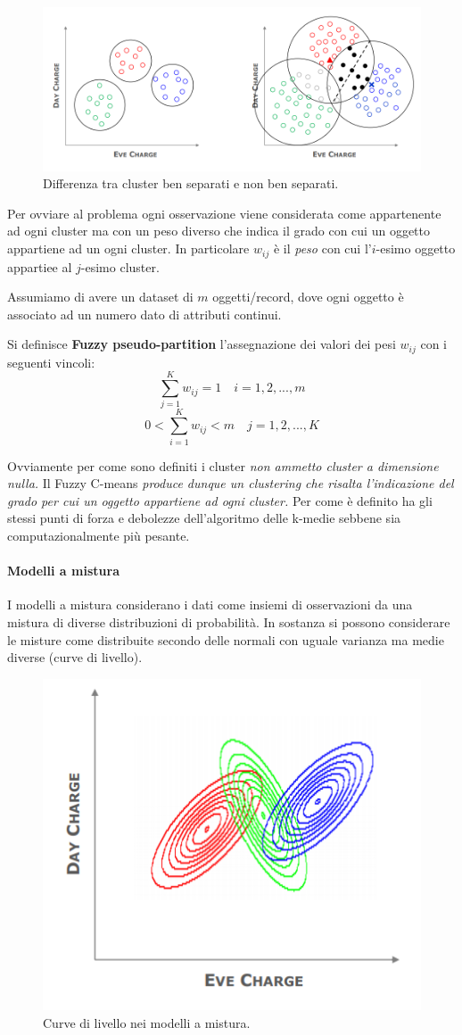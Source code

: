 \begin{figure}[H]
	\centering
	\includegraphics[height=0.4 \linewidth]{clustering/pict/frontiera.png}
	\caption{Differenza tra cluster ben separati e non ben separati.}
\end{figure}
Per ovviare al problema ogni osservazione viene considerata come appartenente ad ogni cluster ma con un peso diverso che indica il grado con cui un oggetto appartiene ad un ogni cluster. In particolare $w_{ij}$ è il \textit{peso} con cui l'$i$-esimo oggetto appartiee al $j$-esimo cluster.

Assumiamo di avere un dataset di $m$ oggetti/record, dove ogni oggetto è associato ad un numero dato di attributi continui.

\begin{defn}
	Si definisce \textbf{Fuzzy pseudo-partition} l'assegnazione dei valori dei pesi $w_{ij}$ con i seguenti vincoli:
	\[\sum_{j = 1}^{K}w_{ij} = 1 \quad i=1,2,...,m\]
	\[0 < \sum_{i = 1}^{K}w_{ij} <  m \quad j=1,2,...,K\]
\end{defn} 

Ovviamente per come sono definiti i cluster \textit{non ammetto cluster a dimensione nulla.} Il Fuzzy C-means \textit{produce dunque un clustering che risalta l'indicazione del grado per cui un oggetto appartiene ad ogni cluster.} Per come è definito ha gli stessi punti di forza e debolezze dell'algoritmo delle k-medie sebbene sia computazionalmente più pesante.

\paragraph{Modelli a mistura}
I modelli a mistura considerano i dati come insiemi di osservazioni da una mistura di diverse distribuzioni di probabilità.  In sostanza si possono considerare le misture come distribuite secondo delle normali con uguale varianza ma medie diverse (curve di livello). 

\begin{figure}[H]
	\centering
	\includegraphics[height=0.3 \linewidth]{clustering/pict/mixture.png}
	\caption{Curve di livello nei modelli a mistura.}
\end{figure}

